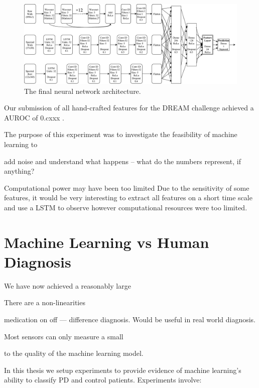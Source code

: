 \documentclass[12pt, twoside]{book}
\begin{document}
\begin{figure}[h]
	\label{finalarchitecture}
	\centering\centerline{\includegraphics[width=1.2\linewidth]{final_architecture.pdf}}
	\caption{The final neural network architecture.}
\end{figure}

Our submission of all hand-crafted features for the DREAM challenge achieved a AUROC of 0.cxxx .



The purpose of this experiment was to investigate the feasibility of machine learning to 

add noise and understand what happens -- what do the numbers represent, if anything?



Computational power may have been too limited
Due to the sensitivity of some features, it would be very interesting to extract all features on a short time scale and use a LSTM to observe
however computational resources were too limited. 

\section{Machine Learning vs Human Diagnosis}
\label{powerml}
We have now achieved a reasonably large 


There are a non-linearities


medication on off --- difference diagnosis. Would be useful in real world diagnosis.

Most sensors can only measure a small 

to the quality of the machine learning model. 


In this thesis we setup experiments to provide evidence of machine learning's ability to classify PD and control patients. Experiments involve:
\end{document}
